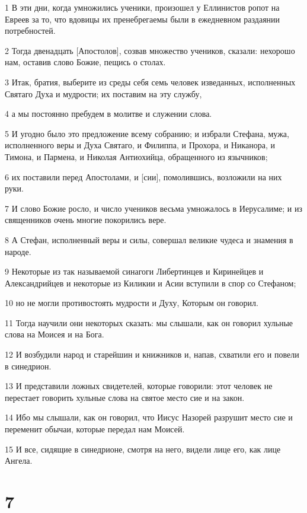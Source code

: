 \par 1 В эти дни, когда умножились ученики, произошел у Еллинистов ропот на Евреев за то, что вдовицы их пренебрегаемы были в ежедневном раздаянии потребностей.
\par 2 Тогда двенадцать [Апостолов], созвав множество учеников, сказали: нехорошо нам, оставив слово Божие, пещись о столах.
\par 3 Итак, братия, выберите из среды себя семь человек изведанных, исполненных Святаго Духа и мудрости; их поставим на эту службу,
\par 4 а мы постоянно пребудем в молитве и служении слова.
\par 5 И угодно было это предложение всему собранию; и избрали Стефана, мужа, исполненного веры и Духа Святаго, и Филиппа, и Прохора, и Никанора, и Тимона, и Пармена, и Николая Антиохийца, обращенного из язычников;
\par 6 их поставили перед Апостолами, и [сии], помолившись, возложили на них руки.
\par 7 И слово Божие росло, и число учеников весьма умножалось в Иерусалиме; и из священников очень многие покорились вере.
\par 8 А Стефан, исполненный веры и силы, совершал великие чудеса и знамения в народе.
\par 9 Некоторые из так называемой синагоги Либертинцев и Киринейцев и Александрийцев и некоторые из Киликии и Асии вступили в спор со Стефаном;
\par 10 но не могли противостоять мудрости и Духу, Которым он говорил.
\par 11 Тогда научили они некоторых сказать: мы слышали, как он говорил хульные слова на Моисея и на Бога.
\par 12 И возбудили народ и старейшин и книжников и, напав, схватили его и повели в синедрион.
\par 13 И представили ложных свидетелей, которые говорили: этот человек не перестает говорить хульные слова на святое место сие и на закон.
\par 14 Ибо мы слышали, как он говорил, что Иисус Назорей разрушит место сие и переменит обычаи, которые передал нам Моисей.
\par 15 И все, сидящие в синедрионе, смотря на него, видели лице его, как лице Ангела.

\chapter{7}

